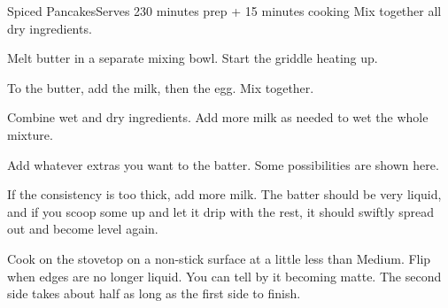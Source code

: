 \documentclass[../Cookbook.tex]{subfiles}
\begin{document}
\begin{recipe}{Spiced Pancakes}{Serves 2}{30 minutes prep + 15 minutes cooking}
	Mix together all dry ingredients.

	Melt butter in a separate mixing bowl. Start the griddle heating up.

	To the butter, add the milk, then the egg. Mix together.

	Combine wet and dry ingredients. Add more milk as needed to wet the whole mixture.

	Add whatever extras you want to the batter. Some possibilities are shown here.
	
	If the consistency is too thick, add more milk. The batter should be very liquid, and if you scoop some up and let it drip with the rest, it should swiftly spread out and become level again.

	\newstep
	Cook on the stovetop on a non-stick surface at a little less than Medium.
	Flip when edges are no longer liquid.
	You can tell by it becoming matte.
	The second side takes about half as long as the first side to finish.
\end{recipe}
\end{document}
